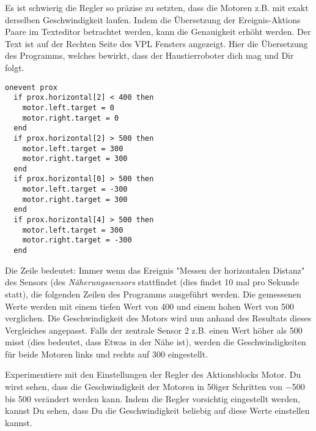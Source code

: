 
Es ist schwierig die Regler so präzise zu setzten, dass die Motoren z.B. mit exakt derselben Geschwindigkeit laufen. Indem die Übersetzung der Ereignis-Aktions Paare im Texteditor betrachtet werden, kann die Genauigkeit erhöht werden. Der Text ist auf der Rechten Seite des VPL Fensters angezeigt. Hier die Übersetzung des Programms, welches bewirkt, dass der Haustierroboter dich mag und Dir folgt. 

\begin{small}
\begin{verbatim}
onevent prox
  if prox.horizontal[2] < 400 then
    motor.left.target = 0
    motor.right.target = 0
  end
  if prox.horizontal[2] > 500 then
    motor.left.target = 300
    motor.right.target = 300
  end
  if prox.horizontal[0] > 500 then
    motor.left.target = -300
    motor.right.target = 300
  end
  if prox.horizontal[4] > 500 then
    motor.left.target = 300
    motor.right.target = -300
  end
\end{verbatim}
\end{small}

Die Zeile  bedeutet:
Immer wenn das Ereignis "Messen der horizontalen Distanz" des Sensors
(des \emph{Näherungssensors} stattfindet (dies findet 10 mal pro Sekunde statt),
die folgenden Zeilen des Programms ausgeführt werden.
Die gemessenen Werte werden mit einem tiefen Wert von 400
und einem hohen Wert von 500 verglichen. Die Geschwindigkeit des Motors wird
nun anhand des Resultats dieses Vergleiches angepasst.
Falls der zentrale Sensor 2 z.B. einen Wert höher als 500 misst
(dies bedeutet, dass Etwas in der Nähe ist),
werden die Geschwindigkeiten für beide Motoren links und rechts auf 300 eingestellt.

Experimentiere mit den Einstellungen
der Regler des Aktionsblocks Motor. Du wirst sehen,
dass die Geschwindigkeit der Motoren in 50iger Schritten von $-$500
bis 500 verändert werden kann.
Indem die Regler vorsichtig eingestellt werden,
kannst Du sehen, dass Du die Geschwindigkeit
beliebig auf diese Werte einstellen kannst.
